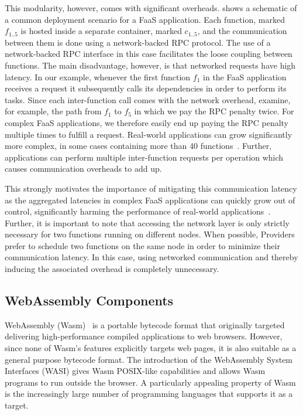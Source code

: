This modularity, however, comes with significant overheads.  shows a schematic of a common deployment scenario for a FaaS application. Each function, marked $f_{1..5}$ is hosted inside a separate container, marked $c_{1..5}$, and the communication between them is done using a network-backed RPC protocol. The use of a network-backed RPC interface in this case facilitates the loose coupling between functions. The main disadvantage, however, is that networked requests have high latency. In our example, whenever the first function $f_1$ in the FaaS application receives a request it subsequently calls its dependencies in order to perform its tasks. Since each inter-function call comes with the network overhead, examine, for example, the path from $f_1$ to $f_5$ in which we pay the RPC penalty twice. For complex FaaS applications, we therefore easily end up paying the RPC penalty multiple times to fulfill a request. Real-world applications can grow significantly more complex, in some cases containing more than 40 functions~\cite{gan19_open_sourc_bench_suite_micros}. Further, applications can perform multiple inter-function requests per operation which causes communication overheads to add up.

This strongly motivates the importance of mitigating this communication latency as the aggregated latencies in complex FaaS applications can quickly grow out of control, significantly harming the performance of real-world applications~\cite{gan19_open_sourc_bench_suite_micros}. Further, it is important to note that accessing the network layer is only strictly necessary for two functions running on different nodes. When possible, Providers prefer to schedule two functions on the same node in order to minimize their communication latency. In this case, using networked communication and thereby inducing the associated overhead is completely unnecessary.

\subsection{WebAssembly Components}
\label{es:subsec:wasm}

WebAssembly (Wasm)~\cite{rossberg22_webas_core_specif} is a portable bytecode format that originally targeted delivering high-performance compiled applications to web browsers. However, since none of Wasm's features explicitly targets web pages, it is also suitable as a general purpose bytecode format. The introduction of the WebAssembly System Interfaces (WASI) gives Wasm POSIX-like capabilities and allows Wasm programs to run outside the browser. A particularly appealing property of Wasm is the increasingly large number of programming languages that supports it as a target.

